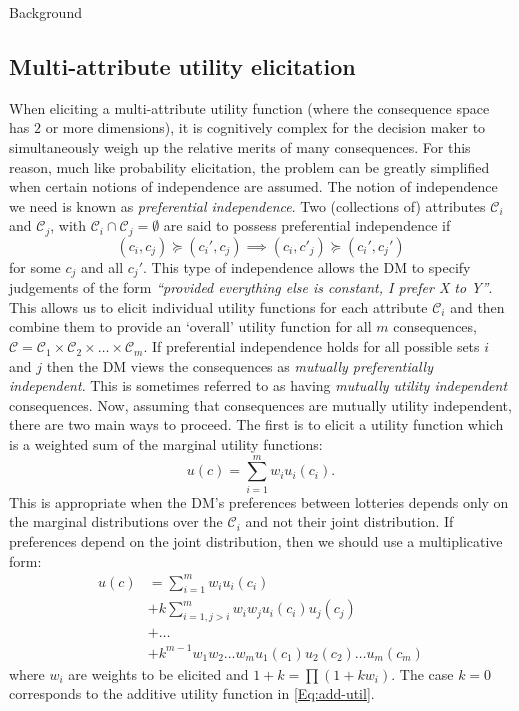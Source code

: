 \begin{chapter}{Background \label{Ch:background}}
\subsection{Multi-attribute utility elicitation}
When eliciting a multi-attribute utility function (where the consequence space has $2$ or more dimensions), it is cognitively complex for the decision maker to simultaneously weigh up the relative merits of many consequences. For this reason, much like probability elicitation, the problem can be greatly simplified when certain notions of independence are assumed. The notion of independence we need is known as \textit{preferential independence}. Two (collections of) attributes $\mathcal{C}_i$ and $\mathcal{C}_j$, with $\mathcal{C}_i \cap \mathcal{C}_j =\emptyset$ are said to possess preferential independence if
\begin{equation*}
  (c_i, c_j) \succeq (c_i', c_j) \implies (c_i, c'_j) \succeq (c_i', c_j')
\end{equation*}
for some $c_j$ and all $c_j'$.  This type of independence allows the DM to specify judgements of the form \textit{``provided everything else is constant, I prefer X to Y''}. This allows us to elicit individual utility functions for each attribute $\mathcal{C}_i$ and then combine them to provide an `overall' utility function for all $m$ consequences, $\mathcal{C} = \mathcal{C}_1 \times \mathcal{C}_2 \times \ldots \times \mathcal{C}_m$. If preferential independence holds for all possible sets $i$ and $j$ then the DM views the consequences as \textit{mutually preferentially independent}. This is sometimes referred to as having \textit{mutually utility independent} consequences.
Now, assuming that consequences are mutually utility independent, there are two main ways to proceed. The first is to elicit a utility function which is a weighted sum of the marginal utility functions:
\begin{equation}
  u(c) = \sum_{i=1}^m w_i u_i(c_i). \label{Eq:add-util}
\end{equation}
This is appropriate when the DM's preferences between lotteries depends only on the marginal distributions over the $\mathcal{C}_i$ and not their joint distribution. If preferences depend on the joint distribution, then we should use a multiplicative form:
\begin{align}
  u(c) &= \sum_{i=1}^m w_i u_i(c_i)\label{Eq:mult-util}\\
        &+ k\sum_{i=1, j>i}^m w_iw_j u_i(c_i) u_j(c_j) \nonumber\\
        &+ \ldots  \nonumber\\
        &+ k^{m-1}w_1 w_2 \ldots w_m u_1(c_1) u_2(c_2)\ldots  u_m(c_m) \nonumber
\end{align}
where $w_i$ are weights to be elicited and $1 + k = \prod (1 + k w_i)$. The case $k = 0$ corresponds to the additive utility function in \cref{Eq:add-util}.


\end{chapter}
